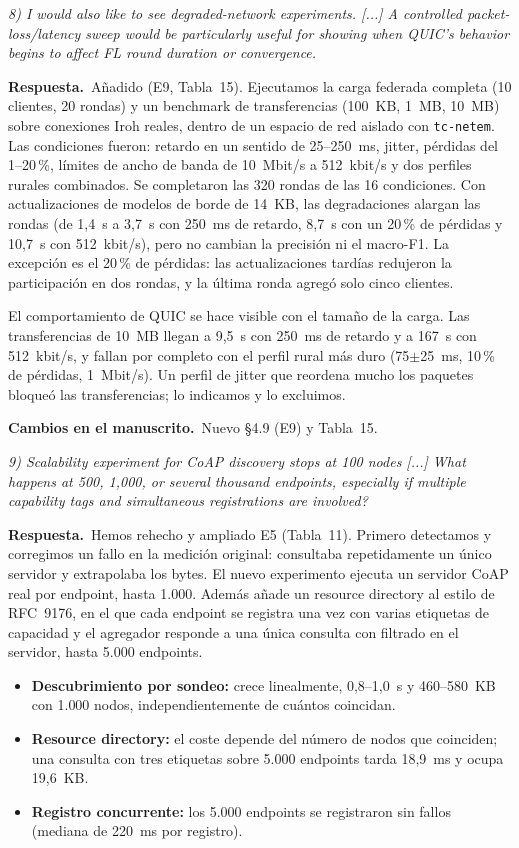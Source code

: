 \documentclass[11pt,a4paper]{article}
\newenvironment{comment}{\par\medskip\noindent\begin{minipage}{\linewidth}\color{blue!45!black}\itshape}{\end{minipage}\par}
\newcommand{\reply}{\par\smallskip\noindent\textbf{Respuesta.}~}
\newcommand{\changes}{\par\smallskip\noindent\textbf{Cambios en el manuscrito.}~}
\begin{document}
\begin{comment}
8) I would also like to see degraded-network experiments. [...] A controlled packet-loss/latency sweep would be particularly useful for showing when QUIC's behavior begins to affect FL round duration or convergence.
\end{comment}
\reply Añadido (E9, Tabla~15). Ejecutamos la carga federada completa (10 clientes, 20 rondas) y un benchmark de transferencias (100~KB, 1~MB, 10~MB) sobre conexiones Iroh reales, dentro de un espacio de red aislado con \texttt{tc-netem}. Las condiciones fueron: retardo en un sentido de 25--250~ms, jitter, pérdidas del 1--20\,\%, límites de ancho de banda de 10~Mbit/s a 512~kbit/s y dos perfiles rurales combinados. Se completaron las 320 rondas de las 16 condiciones. Con actualizaciones de modelos de borde de 14~KB, las degradaciones alargan las rondas (de 1,4~s a 3,7~s con 250~ms de retardo, 8,7~s con un 20\,\% de pérdidas y 10,7~s con 512~kbit/s), pero no cambian la precisión ni el macro-F1. La excepción es el 20\,\% de pérdidas: las actualizaciones tardías redujeron la participación en dos rondas, y la última ronda agregó solo cinco clientes.

El comportamiento de QUIC se hace visible con el tamaño de la carga. Las transferencias de 10~MB llegan a 9,5~s con 250~ms de retardo y a 167~s con 512~kbit/s, y fallan por completo con el perfil rural más duro (75$\pm$25~ms, 10\,\% de pérdidas, 1~Mbit/s). Un perfil de jitter que reordena mucho los paquetes bloqueó las transferencias; lo indicamos y lo excluimos.

\changes Nuevo \S4.9 (E9) y Tabla~15.

\begin{comment}
9) Scalability experiment for CoAP discovery stops at 100 nodes [...] What happens at 500, 1,000, or several thousand endpoints, especially if multiple capability tags and simultaneous registrations are involved?
\end{comment}
\reply Hemos rehecho y ampliado E5 (Tabla~11). Primero detectamos y corregimos un fallo en la medición original: consultaba repetidamente un único servidor y extrapolaba los bytes. El nuevo experimento ejecuta un servidor CoAP real por endpoint, hasta 1{.}000. Además añade un resource directory al estilo de RFC~9176, en el que cada endpoint se registra una vez con varias etiquetas de capacidad y el agregador responde a una única consulta con filtrado en el servidor, hasta 5{.}000 endpoints.
\begin{itemize}[leftmargin=1.3em,itemsep=0.1em]
\item \textbf{Descubrimiento por sondeo:} crece linealmente, 0,8--1,0~s y 460--580~KB con 1{.}000 nodos, independientemente de cuántos coincidan.
\item \textbf{Resource directory:} el coste depende del número de nodos que coinciden; una consulta con tres etiquetas sobre 5{.}000 endpoints tarda 18,9~ms y ocupa 19,6~KB.
\item \textbf{Registro concurrente:} los 5{.}000 endpoints se registraron sin fallos (mediana de 220~ms por registro).
\end{itemize}
\end{document}
